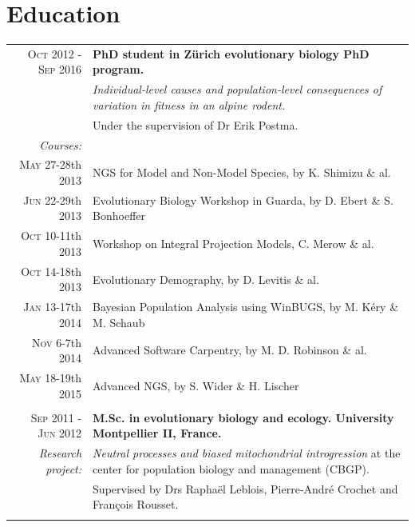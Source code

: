 \documentclass[a4paper,10pt]{article} %
\begin{document}
\section{Education}
\begin{tabular}{r|p{11cm}}
\textsc{Oct 2012 - Sep 2016} & \textbf{PhD student in Z\"{u}rich evolutionary biology PhD program.}\\
								& \emph{Individual-level causes and population-level consequences of variation in fitness in an alpine rodent.}\\ 
								& \footnotesize{Under the supervision of Dr Erik Postma.}\\
\textit{Courses:} & \\
\footnotesize{\textsc{May 27-28}th 2013}& NGS for Model and Non-Model Species, by K. Shimizu \& al.\\
\footnotesize{\textsc{Jun 22-29}th 2013}& Evolutionary Biology Workshop in Guarda, by D. Ebert \& S. Bonhoeffer\\
\footnotesize{\textsc{Oct 10-11}th 2013}& Workshop on Integral Projection Models, C. Merow \& al.\\
\footnotesize{\textsc{Oct 14-18}th 2013}& Evolutionary Demography, by D. Levitis \& al.\\
\footnotesize{\textsc{Jan 13-17}th 2014}& Bayesian Population Analysis using WinBUGS, by M. K\'{e}ry \& M. Schaub\\
\footnotesize{\textsc{Nov 6-7}th 2014}& Advanced Software Carpentry, by M. D. Robinson \& al.\\
\footnotesize{\textsc{May 18-19}th 2015}& Advanced NGS, by S. Wider \& H. Lischer\\
\multicolumn{2}{c}{} \\


\textsc{Sep 2011 - Jun 2012} & \textbf{M.Sc. in evolutionary biology and ecology. University Montpellier II, France.}\\
\textit{Research project:} & \emph{Neutral processes and biased mitochondrial introgression} at the center for population biology and management (CBGP).\\
& \footnotesize{Supervised by Drs Rapha\"{e}l Leblois, Pierre-Andr\'{e} Crochet and Fran\c{c}ois Rousset.}\\
\multicolumn{2}{c}{} \\



\end{tabular}
\end{document}
